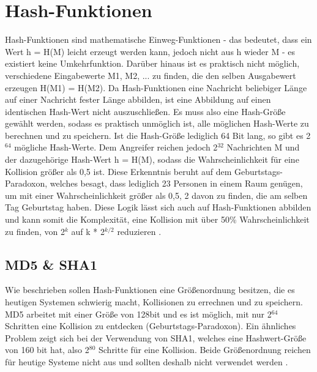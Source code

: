 \documentclass[10pt, a4paper,headsepline]{scrreprt}
\begin{document}
\section{Hash-Funktionen}
Hash-Funktionen sind mathematische Einweg-Funktionen - das bedeutet, dass ein Wert h = H(M) leicht erzeugt werden kann, jedoch nicht aus h wieder M - es existiert keine Umkehrfunktion. Darüber hinaus ist es praktisch nicht möglich, verschiedene Eingabewerte M1, M2, ... zu finden, die den selben Ausgabewert erzeugen H(M1) = H(M2). Da Hash-Funktionen eine Nachricht beliebiger Länge auf einer Nachricht fester Länge abbilden, ist eine Abbildung auf einen identischen Hash-Wert nicht auszuschließen. Es muss also eine Hash-Größe gewählt werden, sodass es praktisch unmöglich ist, alle möglichen Hash-Werte zu berechnen und zu speichern. Ist die Hash-Größe lediglich 64 Bit lang, so gibt es 2$^{64}$ mögliche Hash-Werte. Dem Angreifer reichen jedoch 2$^{32}$ Nachrichten M und der dazugehörige Hash-Wert h = H(M), sodass die Wahrscheinlichkeit für eine Kollision größer als 0,5 ist. Diese Erkenntnis beruht auf dem Geburtstags-Paradoxon, welches besagt, dass lediglich 23 Personen in einem Raum genügen, um mit einer Wahrscheinlichkeit größer als 0,5, 2 davon zu finden, die am selben Tag Geburtstag haben. Diese Logik lässt sich auch auf Hash-Funktionen abbilden und kann somit die Komplexität, eine Kollision mit über 50\% Wahrscheinlichkeit zu finden, von 2$^{k}$ auf k * 2$^{k/2}$ reduzieren \cite[S. 375ff]{book:it-sicherheit}.

\subsection{MD5 \& SHA1}
Wie beschrieben sollen Hash-Funktionen eine Größenordnung besitzen, die es heutigen Systemen schwierig macht, Kollisionen zu errechnen und zu speichern. MD5 arbeitet mit einer Größe von 128bit und es ist möglich, mit nur 2$^{64}$ Schritten eine Kollision zu entdecken (Geburtstags-Paradoxon). Ein ähnliches Problem zeigt sich bei der Verwendung von SHA1, welches eine Hashwert-Größe von 160 bit hat, also 2$^{80}$ Schritte für eine Kollision. Beide Größenordnung reichen für heutige Systeme nicht aus und sollten deshalb nicht verwendet werden \citep[S.382ff]{book:it-sicherheit} \citep[S. 84ff]{book:practical-crypto} \citep[S. 498ff, 504ff]{book:angewandte-krypto}.
\end{document}
